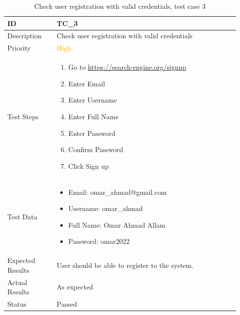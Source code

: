 \documentclass{scrartcl}
\begin{document}
\begin{table}[H]
  \caption{Check user registration with valid credentials, test case 3}
  \begin{tabular}{p{0.2\linewidth} | p{0.74\linewidth}}
    \toprule
    ID & TC\_3
    \\\midrule
    Description & Check user registration with valid credentials
    \\\hline
    Priority & \textcolor{orange}{High}
    \\\hline
    Test Steps & {
                 \begin{enumerate}
                 \item Go to \url{https://search-engine.org/signup}
                 \item Enter Email
                 \item Enter Username
                 \item Enter Full Name
                 \item Enter Password
                 \item Confirm Password
                 \item Click Sign up
                 \end{enumerate}
                 }\vspace*{-\baselineskip}
    \\\hline
    Test Data & {
                \begin{itemize}
                \item Email: omar\_ahmad@gmail.com
                \item Username: omar\_ahmad
                \item Full Name: Omar Ahmad Allam
                \item Password: omar2022
                \end{itemize}
                }\vspace*{-\baselineskip}
    \\\hline
    Expected Results & User should be able to register to the system.
    \\\hline
    Actual Results & As expected
    \\\hline
    Status & Passed
    \\\bottomrule
  \end{tabular}
\end{table}
\end{document}
